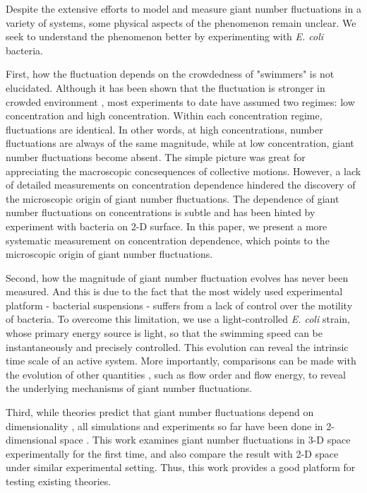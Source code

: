 \documentclass[twocolumn,aps,pre,amsmath,amssymb,longbibliography]{revtex4-1}
\begin{document}
Despite the extensive efforts to model and measure giant number fluctuations in a variety of systems, some physical aspects of the phenomenon remain unclear. We seek to understand the phenomenon better by experimenting with \textit{E. coli} bacteria.



First, how the fluctuation depends on the crowdedness of "swimmers" is not elucidated. Although it has been shown that the fluctuation is stronger in crowded environment \cite{PhysRevE.95.020601, Zhang13626}, most experiments to date have assumed two regimes: low concentration and high concentration. Within each concentration regime, fluctuations are identical. In other words, at high concentrations, number fluctuations are always of the same magnitude, while at low concentration, giant number fluctuations become absent. The simple picture was great for appreciating the macroscopic concsequences of collective motions. However, a lack of detailed measurements on concentration dependence hindered the discovery of the microscopic origin of giant number fluctuations. The dependence of giant number fluctuations on concentrations is subtle and has been hinted by experiment with bacteria on 2-D surface\cite{Zhang13626}. In this paper, we present a more systematic measurement on concentration dependence, which points to the microscopic origin of giant number fluctuations.

Second, how the magnitude of giant number fluctuation evolves has never been measured. And this is due to the fact that the most widely used experimental platform - bacterial suspensions - suffers from a lack of control over the motility of bacteria. To overcome this limitation, we use a light-controlled \textit{E. coli} strain, whose primary energy source is light, so that the swimming speed can be instantaneously and precisely controlled. This evolution can reveal the intrinsic time scale of an active system. More importantly, comparisons can be made with the evolution of other quantities \cite{Peng2020}, such as flow order and flow energy, to reveal the underlying mechanisms of giant number fluctuations.

Third, while theories predict that giant number fluctuations depend on dimensionality \cite{PhysRevLett.75.4326, PhysRevE.58.4828, EPL2003, doi:10.1146/annurev-conmatphys-031119-050752}, all simulations and experiments so far have been done in 2-dimensional space \cite{PhysRevE.77.046113, PhysRevLett.123.218001, Schaller4488, PhysRevE.95.020601}. This work examines giant number fluctuations in 3-D space experimentally for the first time, and also compare the result with 2-D space under similar experimental setting. Thus, this work provides a good platform for testing existing theories.
\end{document}
